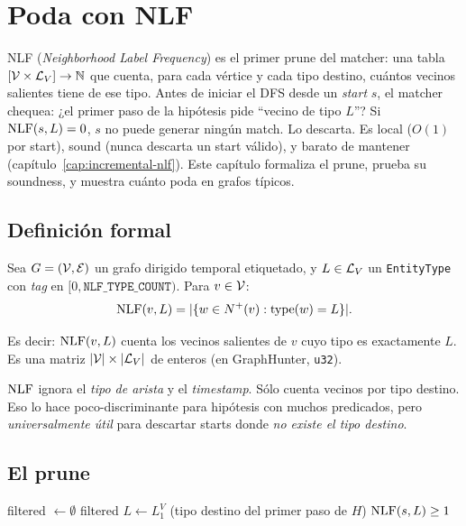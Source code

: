 \chapter{Poda con NLF}
\label{cap:prune-nlf}

\begin{intuicion}
NLF (\emph{Neighborhood Label Frequency}) es el primer prune del
matcher: una tabla \([\mathcal{V} \times \mathcal{L}_V] \to \mathbb{N}\) que cuenta,
para cada vértice y cada tipo destino, cuántos vecinos salientes
tiene de ese tipo. Antes de iniciar el DFS desde un \emph{start}
\(s\), el matcher chequea: ¿el primer paso de la hipótesis pide
``vecino de tipo \(L\)''? Si \(\mathrm{NLF}(s, L) = 0\), \(s\) no puede
generar ningún match. Lo descarta. Es local (\(O(1)\) por start),
sound (nunca descarta un start válido), y barato de mantener
(capítulo~\ref{cap:incremental-nlf}). Este capítulo formaliza el
prune, prueba su soundness, y muestra cuánto poda en grafos
típicos.
\end{intuicion}

\section{Definición formal}

\begin{definition}[NLF]
Sea \(G = (\mathcal{V}, \mathcal{E})\) un grafo dirigido temporal etiquetado, y
\(L \in \mathcal{L}_V\) un \texttt{EntityType} con \emph{tag} en
\([0, \texttt{NLF\_TYPE\_COUNT})\). Para \(v \in \mathcal{V}\):
\[
\mathrm{NLF}(v, L) = |\{w \in N^{+}(v) : \mathrm{type}(w) = L\}|.
\]
\end{definition}

\noindent
Es decir: \(\mathrm{NLF}(v, L)\) cuenta los vecinos salientes de \(v\) cuyo
tipo es exactamente \(L\). Es una matriz \(|\mathcal{V}| \times
|\mathcal{L}_V|\) de enteros (en GraphHunter, \texttt{u32}).

\begin{nota}
\(\mathrm{NLF}\) ignora el \emph{tipo de arista} y el \emph{timestamp}.
Sólo cuenta vecinos por tipo destino. Eso lo hace
poco-discriminante para hipótesis con muchos predicados, pero
\emph{universalmente útil} para descartar starts donde \emph{no
existe el tipo destino}.
\end{nota}

\section{El prune}

\begin{algorithm}[H]
\caption{Prune NLF al inicio del DFS}
filtered \(\leftarrow \emptyset\)\;
\Return filtered\;
\BlankLine
{}
\(L \leftarrow L_1^V\) (tipo destino del primer paso de \(H\))\;
\Return \(\mathrm{NLF}(s, L) \geq 1\)\;
\end{algorithm}

